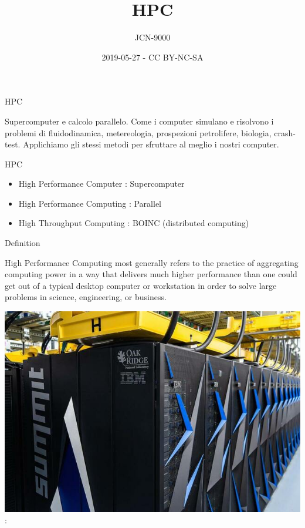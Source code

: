 \documentclass[ignorenonframetext,]{beamer}
\title{HPC}
\author{JCN-9000}
\date{2019-05-27 - CC BY-NC-SA}
\providecommand{\tightlist}{%
  \setlength{\itemsep}{0pt}\setlength{\parskip}{0pt}}
\begin{document}
\frame{\titlepage}

\begin{frame}{HPC}

Supercomputer e calcolo parallelo. Come i computer simulano e risolvono
i problemi di fluidodinamica, metereologia, prospezioni petrolifere,
biologia, crash-test. Applichiamo gli stessi metodi per sfruttare al
meglio i nostri computer.

\end{frame}

\begin{frame}{HPC}

\begin{itemize}
\tightlist
\item
  High Performance Computer : Supercomputer
\item
  High Performance Computing : Parallel
\item
  High Throughput Computing : BOINC (distributed computing)
\end{itemize}


\end{frame}

\begin{frame}{Definition}

\begin{description}
\tightlist
\item[\href{https://insidehpc.com/hpc-basic-training/what-is-hpc/}{HPC}]
High Performance Computing most generally refers to the practice of
aggregating computing power in a way that delivers much higher
performance than one could get out of a typical desktop computer or
workstation in order to solve large problems in science, engineering, or
business.
\end{description}

\includegraphics{images/Summit_small.jpg} :

\end{frame}
\end{document}
